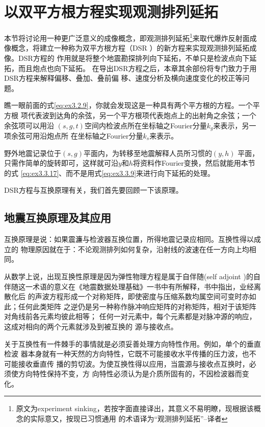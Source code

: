 \section{以双平方根方程实现观测排列延拓}
\label{sec:3.3}
本节将讨论用一种更广泛意义的成像概念，即观测排列延拓\footnote{原文为experiment
sinking，若按字面直接译出，其意义不易明瞭，现根据该概念的实际意又，按现已习惯通用
的术语译为“观测排列延拓”--译者}来取代爆炸反射面成像概念，将建立一种称为双平方根方程（DSR
）的新方程来实现观测排列延拓成像。DSR方程的
作用就是将整个地震勘探排列向下延拓，不单只是检波点向下延拓，而且炮点也向下延拓。
在导出DSR方程之后，本章其余部份将专门致力于用DSR方程来解释偏移、叠加、叠前偏
移、速度分析及横向速度变化的校正等问题。

瞧一眼前面的式\ref{eq:ex3.2.9}，你就会发现这是一种具有两个平方根的方程。一个平方根
项代表波到达角的余弦，另一个平方根项代表炮点上的出射角之余弦；一个余弦项可以用沿
$(s,g,t)$空间内检波点所在坐标轴之Fourier分量$k_g$来表示，另一项余弦可用沿炮点所
在坐标轴之Fourier分量$k_s$来表示。

野外地震记录位于$(s,g)$平面内，为转移至地震解释人员所习惯的$(y,h)$
平面，只需作简单的旋转即可，这样就可沿$y$和$h$将资料作Fourier变换，然后就能用本节的式
\ref{eq:ex3.3.17}、而不是用式\ref{eq:ex3.3.9}来进行向下延拓的处理。

DSR方程与互换原理有关，我们首先要回顾一下该原理。

\subsection{地震互换原理及其应用}
\label{sec:3.3.1}

互换原理是说：如果震濂与检波器互换位置，所得地震记录应相同。互换性得以成立的
物理原因就在于：不论观测排列如何复杂，沿射线的波速在任一方向上均相同。

从数学上说，出现互换性原理是因为弹性物理方程是属于自伴随(self adjoint
)的自伴随这一术语的意义在《地震数据处理基础》一书中有所解释，书中指出，业经离散化后
的声波方程形成一个对称矩阵，即使密度与压缩系数均属空间可变时亦如此；任何此类矩阵
之逆仍是另一种称作脉冲响应矩阵的对称矩阵，相对于该矩阵对角线前各元素均彼此相等；
任何一对元素中，每个元素都是对脉冲源的响应，这成对相向的两个元素就涉及到被互换的
源与接收点。

关于互换性有一件棘手的事情就是必须妥善处理方向特性作用。例如，单个的垂直检波
器本身就有一种天然的方向特性，它既不可能接收水平传播的压力波，也不可能接收垂直传
播的剪切波。为使互换性得以应用，当震源与接收点互换时，必须使方向特性保持不变，方
向特性必须认为是介质所固有的，不因检波器而变化。


